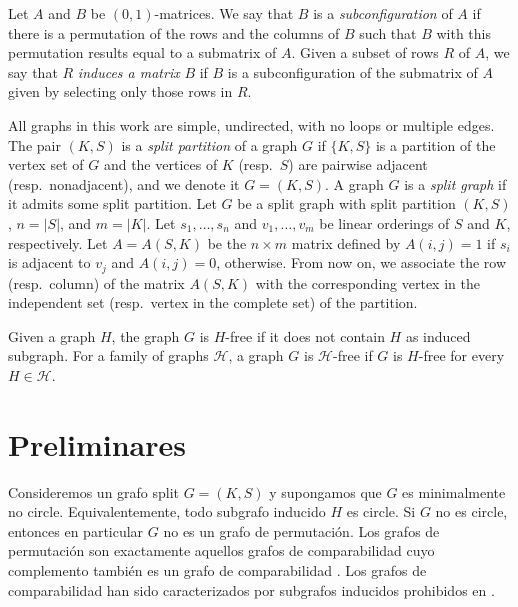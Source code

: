 \documentclass[12pt]{book}
\theoremstyle{plain}
\theoremstyle{remark}
\begin{document}
 


Let $A$ and $B$ be $(0,1)$-matrices. We say that $B$ is a \emph{subconfiguration} of $A$ if there is a permutation of the rows and the columns of $B$ such that $B$ with this permutation results equal to a submatrix of $A$. %
Given a subset of rows $R$ of $A$, we say that $R$ \emph{induces a matrix} $B$ if $B$ is a subconfiguration of the submatrix of $A$ given by selecting only those rows in $R$.

All graphs in this work are simple, undirected, with no loops or multiple edges. The pair $(K,S)$ is a \emph{split partition} of a graph $G$ if $\{K,S\}$ is a partition of the vertex set of $G$ and the vertices of $K$ (resp.\ $S$) are pairwise adjacent (resp.\ nonadjacent), and we denote it $G=(K,S)$. A graph $G$ is a \emph{split graph} if it admits some split partition. Let $G$ be a split graph with split partition $(K,S)$, $n=\vert S\vert$, and $m=\vert K\vert$.
Let $s_1, \ldots, s_n$ and $v_1, \ldots, v_m$ be linear orderings of $S$ and $K$, respectively. Let $A= A(S,K)$ be the $n\times m$ matrix defined by $A(i,j)=1$ if $s_i$ is adjacent to $v_j$ and $A(i,j)=0$, otherwise.
From now on, we associate the row (resp.\ column) of the matrix $A(S,K)$ with the corresponding vertex in the independent set (resp.\ vertex in the complete set) of the partition.

Given a graph $H$, the graph $G$ is $H$-free if it does not contain $H$ as induced subgraph. For a family of graphs $\mathcal{H}$, a graph
$G$ is $\mathcal{H}$-free if $G$ is $H$-free for every $H \in \mathcal{H}$.






%
\chapter*{Preliminares}

Consideremos un grafo split $G=(K,S)$ y supongamos que $G$ es minimalmente no circle. Equivalentemente, todo subgrafo inducido $H$ es circle. Si $G$ no es circle, entonces en particular $G$ no es un grafo de permutación. 
Los grafos de permutación son exactamente aquellos grafos de comparabilidad cuyo complemento también es un grafo de comparabilidad \cite{EPL72}. Los grafos de comparabilidad han sido caracterizados por subgrafos inducidos prohibidos en \cite{G67}.
\end{document}
